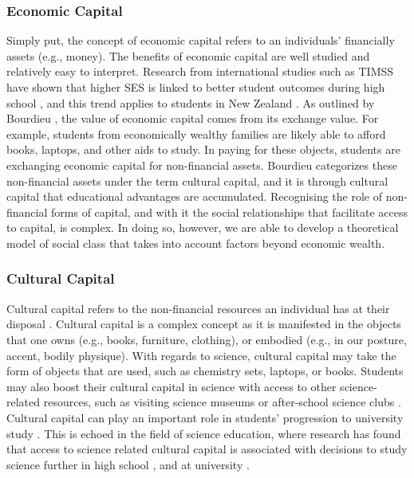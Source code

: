 \documentclass[smallextended]{svjour3}       %
\begin{document}
\subsubsection*{Economic Capital}
Simply put, the concept of economic capital refers to an individuals' financially assets (e.g., money). The benefits of economic capital are well studied and relatively easy to interpret. Research from international studies such as TIMSS have shown that higher SES is linked to better student outcomes during high school \cite{mullis2016timss}, and this trend applies to students in New Zealand \cite{May_2016}. As outlined by Bourdieu \citeyear{Bourdieu_1986}, the value of economic capital comes from its exchange value. For example, students from economically wealthy families are likely able to afford books, laptops, and other aids to study. In paying for these objects, students are exchanging economic capital for non-financial assets. Bourdieu categorizes these non-financial assets under the term cultural capital, and it is through cultural capital that educational advantages are accumulated. Recognising the role of non-financial forms of capital, and with it the social relationships that facilitate access to capital, is complex. In doing so, however, we are able to develop a theoretical model of social class that takes into account factors beyond economic wealth. 

\subsubsection*{Cultural Capital}
Cultural capital refers to the non-financial resources an individual has at their disposal \cite{Bourdieu_1986}. Cultural capital is a complex concept as it is manifested in the objects that one owns (e.g., books, furniture, clothing), or embodied (e.g., in our posture, accent, bodily physique). With regards to science, cultural capital may take the form of objects that are used, such as chemistry sets, laptops, or books. Students may also boost their cultural capital in science with access to other science-related resources, such as visiting science museums \cite{Dawson2014} or after-school science clubs \cite{mujtaba2018students}. Cultural capital can play an important role in students' progression to university study \cite{aschaffenburg1997cultural}. This is echoed in the field of science education, where research has found that access to science related cultural capital is associated with decisions to study science further in high school \cite{mujtaba2018students}, and at university \cite{Lyons_2006}.
\end{document}

